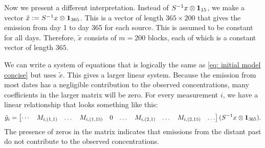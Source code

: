 \documentclass{article}
\begin{document}
Now we present a different interpretation. Instead of $S^{-1} x \otimes \vb{1}_{15}$, we make a vector $\tilde{x} := S^{-1} x \otimes \vb{1}_{365}$. This is a vector of length $365 \times 200$ that gives the emission from day 1 to day 365 for each source. This is assumed to be constant for all days. Therefore, $\tilde{x}$ consists of $m = 200$ blocks, each of which is a constant vector of length $365$.

We can write a system of equations that is logically the same as \cref{eq: initial model concise} but uses $\tilde{x}$. This gives a larger linear system. Because the emission from most dates has a negligible contribution to the observed concentrations, many coefficients in the larger matrix will be zero. For every measurement $i$, we have a linear relationship that looks something like this:
$$
        \hat{y}_i
    =
    \begin{bmatrix}
        \cdots & M_{i,(1,1)} & \dots & M_{i,(1,15)} & 0 & \dots & M_{i,(2,1)} & \dots & M_{i,(2,15)} & \dots
    \end{bmatrix}
    (S^{-1} x \otimes \vb{1}_{365})
.
$$
The presence of zeros in the matrix indicates that emissions from the distant past do not contribute to the observed concentrations.
\end{document}
